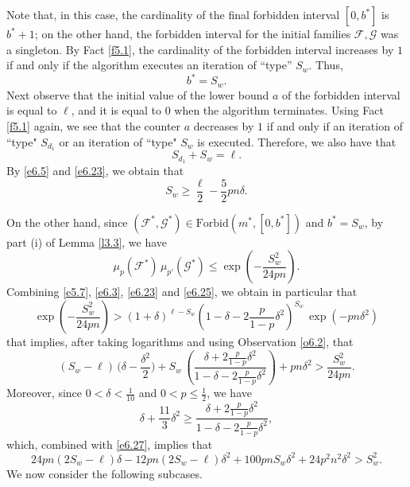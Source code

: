 \documentclass[10pt,a4paper]{amsart}
\theoremstyle{remark}
\newcommand{\meg}{\geqslant}
\newcommand{\mik}{\leqslant}
\newcommand{\Fcal}{\mathcal{F}}
\newcommand{\Gcal}{\mathcal{G}}
\begin{document}
Note that, in this case, the cardinality of the final forbidden interval $[0,b^*]$ is $b^*+1$;
on the other hand, the forbidden interval for the initial families $\Fcal,\Gcal$ was a singleton.
By Fact \ref{f5.1}, the cardinality of the forbidden interval increases by $1$
if and only if the algorithm executes an iteration of ``type'' $S_w$. Thus,
\begin{equation} \label{e6.22}
b^*=S_w.
\end{equation}
Next observe that the initial value of the lower bound $a$ of the forbidden interval is equal to $\ell$,
and it is equal to $0$ when the algorithm terminates. Using Fact \ref{f5.1} again, we see that
the counter $a$ decreases by $1$ if and only if an iteration of ``type" $S_{d_1}$ or an iteration
of ``type" $S_w$ is executed. Therefore, we also have that
\begin{equation} \label{e6.23}
S_{d_1}+S_w=\ell.
\end{equation}
By \eqref{e6.5} and \eqref{e6.23}, we obtain that
\begin{equation} \label{e6.24}
S_w\meg \frac{\ell}{2}-\frac52 pn\delta.
\end{equation}

On the other hand, since $\left(\Fcal^*,\Gcal^*\right)\in\mathrm{Forbid}(m^*,[0,b^*])$ and $b^*=S_w$,
by part (i) of Lemma \ref{l3.3}, we have
\begin{equation} \label{e6.25}
\mu_p(\Fcal^*)\,\mu_{p'}(\Gcal^*)\mik \exp\left(-\frac{S_w^2}{24pn}\right).
\end{equation}
Combining \eqref{e5.7}, \eqref{e6.3}, \eqref{e6.23} and \eqref{e6.25}, we obtain in particular that
\begin{equation} \label{e6.26}
\exp\left(-\frac{S_w^2}{24pn}\right) > (1+\delta)^{\ell-S_w} \left(1-\delta-2\frac{p}{1-p}\delta^2\right)^{S_w}\,
\exp\left(-pn\delta^2\right)
\end{equation}
that implies, after taking logarithms and using Observation \ref{o6.2}, that
\begin{equation} \label{e6.27}
(S_w-\ell)\, \Big(\delta-\frac{\delta^2}{2}\Big) +
S_w\, \left(\frac{\delta+2\frac{p}{1-p}\delta^2}{1-\delta-2\frac{p}{1-p}\delta^2}\right)+pn\delta^2
> \frac{S_w^2}{24pn}.
\end{equation}
Moreover, since $0<\delta<\frac{1}{10}$ and $0<p\mik \frac12$, we have
\begin{equation} \label{e6.28}
\delta+\frac{11}{3}\delta^2 \meg \frac{\delta+2\frac{p}{1-p}\delta^2}{1-\delta-2\frac{p}{1-p}\delta^2},
\end{equation}
which, combined with \eqref{e6.27}, implies that
\begin{equation} \label{e6.29}
24pn(2S_w-\ell)\delta - 12pn(2S_w-\ell)\delta^2 + 100 pnS_w\delta^2 +
24 p^2n^2\delta^2> S_w^2.
\end{equation}
We now consider the following subcases.
\end{document}
